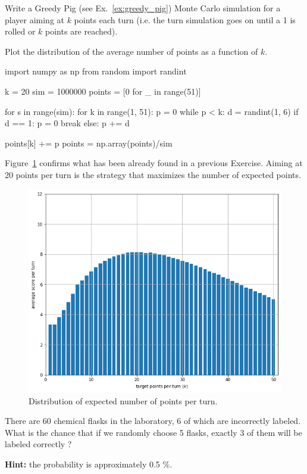 \begin{question}
Write a Greedy Pig (see Ex.~\ref{ex:greedy_pig}) Monte Carlo simulation for a player aiming at $k$ points each turn (i.e. the turn simulation goes on until a 1 is rolled or $k$ points are reached).

Plot the distribution of the average number of points as a function of $k$.
\end{question}
\cprotEnv\begin{solution}
\begin{ipython}
import numpy as np
from random import randint

k = 20
sim = 1000000
points = [0 for _ in range(51)]

for s in range(sim):
    for k in range(1, 51):
        p = 0 
        while p < k:
            d = randint(1, 6)
            if d == 1:
                p = 0
                break
            else:
                p += d

points[k] += p
points = np.array(points)/sim
\end{ipython}

Figure~\ref{fig:greedy_pig_sim} confirms what has been already found in a previous Exercise. Aiming at 20 points per turn is the strategy that maximizes the number of expected points.

\begin{figure}[htbp]
	\begin{center}
		\includegraphics[width=0.7\linewidth]{figures/greedy_pig_sim}
	\end{center}
\caption{Distribution of expected number of points per turn.}
\label{fig:greedy_pig_sim}
\end{figure}
\end{solution}

\begin{question}
There are 60 chemical flasks in the laboratory, 6 of which are incorrectly labeled. What is the chance that if we randomly choose 5 flasks, exactly 3 of them will be labeled correctly ?

\noindent\textbf{Hint:} the probability is approximately 0.5 \%.
\end{question}

